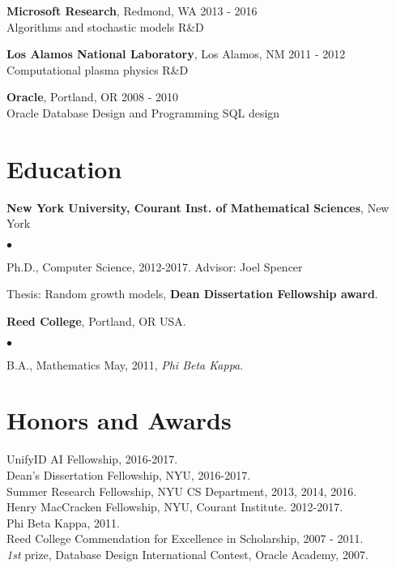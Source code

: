 \documentclass[margin,line]{res}
\newenvironment{list2}{
  \begin{list}{$\bullet$}{%
      \setlength{\itemsep}{0in}
      \setlength{\parsep}{0in} \setlength{\parskip}{0in}
      \setlength{\topsep}{0in} \setlength{\partopsep}{0in} 
      \setlength{\leftmargin}{0.2in}}}{\end{list}}
\begin{document}
\begin{resume}
{\bf Microsoft Research}, Redmond, WA \hfill {2013 - 2016}\\
\vspace{-.1cm}
Algorithms and stochastic models R\&D

{\bf Los Alamos National Laboratory}, Los Alamos, NM  \hfill 2011 - 2012\\
\vspace{-.1cm}
Computational plasma physics R\&D

{\bf Oracle}, Portland, OR \hfill 2008 - 2010\\
\vspace{-.1cm}
Oracle Database Design and Programming SQL design
\vspace{-.2cm}


\section{\sc Education}
{\bf New York University, Courant Inst. of Mathematical Sciences}, New York
\begin{list2}
\item Ph.D., Computer Science, 2012-2017. Advisor: Joel Spencer
\item Thesis: Random growth models, \textbf{Dean Dissertation Fellowship award}.

\vspace*{-.1in}
\end{list2}

{\bf Reed College}, Portland, OR USA.
\begin{list2}
\item B.A., Mathematics  May, 2011, {\it Phi Beta Kappa}.
\vspace*{-.05in}
\end{list2} 

\section{\sc Honors and Awards}
UnifyID AI Fellowship, 2016-2017.\\
Dean's Dissertation Fellowship, NYU, 2016-2017.\\
Summer Research Fellowship, NYU CS Department, 2013, 2014, 2016.\\
Henry MacCracken Fellowship, NYU, Courant Institute. 2012-2017.\\
Phi Beta Kappa, 2011.\\
Reed College Commendation for Excellence in Scholarship, 2007 - 2011. \\
\emph{1st} prize, Database Design International Contest, Oracle Academy, 2007.


\end{resume}
\end{document}
